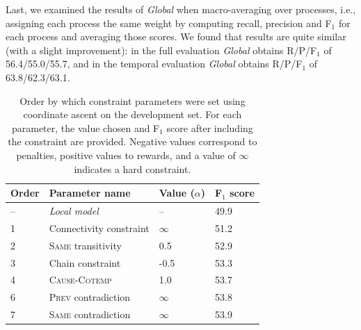 Last, we examined the results of \emph{Global} when macro-averaging over processes, i.e., assigning each process the same weight by computing recall, precision and F$_1$ for each process and averaging those scores. We found that results are quite similar (with a slight improvement): in the full evaluation \emph{Global} obtains R/P/F$_1$ of 56.4/55.0/55.7, and in the temporal evaluation \emph{Global} obtains R/P/F$_1$ of 63.8/62.3/63.1.

\begin{table}[t]
{\footnotesize
\begin{tabular}{ l | l | l | l }
    \textbf{Order} & \textbf{Parameter name} & \textbf{Value} ($\alpha$)& \textbf{F$_1$ score} \\
\hline
-- & \emph{Local model} & -- & 49.9 \\
1 & Connectivity constraint & $\infty$ & 51.2 \\
2 & \textsc{Same} transitivity &  0.5 & 52.9 \\
3 & Chain constraint & -0.5 & 53.3\\
4 & \textsc{Cause}-\textsc{Cotemp} & 1.0 & 53.7\\
6 & \textsc{Prev} contradiction & $\infty$ & 53.8\\
7 & \textsc{Same} contradiction & $\infty$ & 53.9
\end{tabular}}
\caption{Order by which constraint parameters were set using coordinate ascent on the development set. For each parameter, the value chosen and F$_1$ score after including the constraint are provided. Negative values correspond to penalties, positive values to rewards, and a value of $\infty$ indicates a hard constraint.}
\label{tab:paramtuning}
\end{table}

